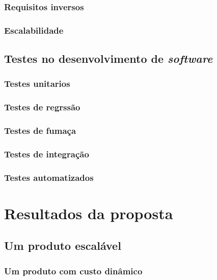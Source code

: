 \documentclass[]{../class/politex}
\begin{document}
      \subsection{Requisitos inversos}

      \subsection{Escalabilidade}

    \section{Testes no desenvolvimento de \textit{software}}

      \subsection{Testes unitarios}

      \subsection{Testes de regrssão}

      \subsection{Testes de fumaça}

      \subsection{Testes de integração}

      \subsection{Testes automatizados}

  

  \chapter{Resultados da proposta}

    \section{Um produto escalável}

      \subsection{Um produto com custo dinâmico}
\end{document}
